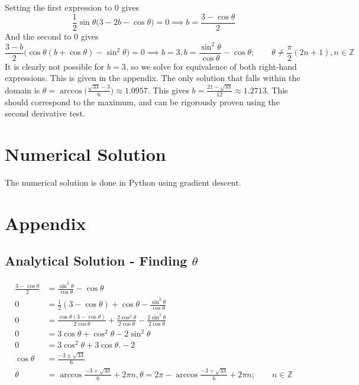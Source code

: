\documentclass{article}
\begin{document}
Setting the first expression to 0 gives
$$ \frac{1}{2} \sin \theta \big(3 - 2b - \cos \theta) = 0 \implies b  = \frac{3 - \cos \theta}{2}$$
And the second to 0 gives 
$$ \frac{3-b}{2} \big( \cos \theta (b + \cos \theta ) - \sin^2 \theta \big) = 0 \implies b = 3, b = \frac{\sin^2 \theta }{\cos \theta} - \cos \theta; \qquad \theta \neq \frac{\pi}{2}(2n + 1) , n \in \mathbb{Z}$$
It is clearly not possible for $b = 3$, so we solve for equivalence of both right-hand expressions. This is given in the appendix. The only solution that falls within the domain is $\theta = \arccos \big(\frac{\sqrt{33} - 3}{6} \big) \approx 1.0957$. This gives $b = \frac{21 - \sqrt{33}}{12} \approx 1.27	13$. This should correspond to the maximum, and can be rigorously proven using the second derivative test.

\section*{Numerical Solution}
The numerical solution is done in Python using gradient descent. 

\section*{Appendix}
\subsection*{Analytical Solution - Finding $\theta$}
\begin{align*}
	\frac{3 - \cos \theta}{2} &= \frac{\sin^2 \theta }{\cos \theta} - \cos \theta \\
	0 &= \frac{1}{2}(3 - \cos \theta ) + \cos \theta  - \frac{\sin^2 \theta}{\cos \theta} \\
	0 &= \frac{\cos \theta (3- \cos \theta)}{2 \cos \theta} + \frac{2\cos^2 \theta }{2\cos \theta} - \frac{2 \sin^2 \theta}{2 \cos \theta }\\
	0 &= 3 \cos \theta + \cos^2 \theta - 2 \sin^2 \theta  \\
		0 &= 3 \cos^2 \theta + 3 \cos \theta. - 2 \\
	\cos\theta &= \frac{-3 \pm \sqrt{33}}{6} \\
	\theta &= \arccos \frac{-3 + \sqrt{33}}{6} + 2 \pi n, \theta = 2\pi - \arccos \frac{-3 + \sqrt{33}}{6} + 2 \pi n; \qquad n \in \mathbb{Z}
	\end{align*}
\end{document}

